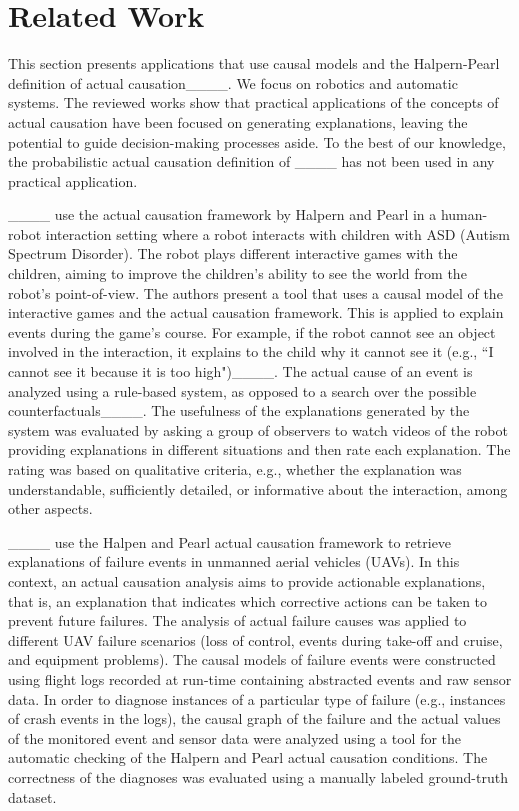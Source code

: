 \section{Related Work}
\label{sec:related_work}
	This section presents applications that use causal models and the Halpern-Pearl definition of actual causation____. We focus on robotics and automatic systems. The reviewed works show that practical applications of the concepts of actual causation have been focused on generating explanations, leaving the potential to guide decision-making processes aside. To the best of our knowledge, the probabilistic actual causation definition of ____ has not been used in any practical application. 
	
	____ use the actual causation framework by Halpern and Pearl in a human-robot interaction setting where a robot interacts with children with ASD (Autism Spectrum Disorder). The robot plays different interactive games with the children, aiming to improve the children's ability to see the world from the robot's point-of-view. The authors present a tool that uses a causal model of the interactive games and the actual causation framework. This is applied to explain events during the game's course. For example, if the robot cannot see an object involved in the interaction, it explains to the child why it cannot see it (e.g., ``I cannot see it because it is too high")____. The actual cause of an event is analyzed using a rule-based system, as opposed to a search over the possible counterfactuals____. The usefulness of the explanations generated by the system was evaluated by asking a group of observers to watch videos of the robot providing explanations in different situations and then rate each explanation. The rating was based on qualitative criteria, e.g., whether the explanation was understandable, sufficiently detailed, or informative about the interaction, among other aspects. 
	
	____ use the Halpen and Pearl actual causation framework to retrieve explanations of failure events in unmanned aerial vehicles (UAVs). In this context, an actual causation analysis aims to provide actionable explanations, that is, an explanation that indicates which corrective actions can be taken to prevent future failures. The analysis of actual failure causes was applied to different UAV failure scenarios (loss of control, events during take-off and cruise, and equipment problems). The causal models of failure events were constructed using flight logs recorded at run-time containing abstracted events and raw sensor data. In order to diagnose instances of a particular type of failure (e.g., instances of crash events in the logs), the causal graph of the failure and the actual values of the monitored event and sensor data were analyzed using a tool for the automatic checking of the Halpern and Pearl actual causation conditions. The correctness of the diagnoses was evaluated using a manually labeled ground-truth dataset.
	
